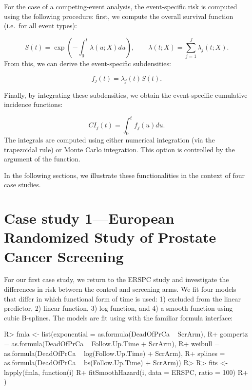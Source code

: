 \documentclass[
]{jss}
\begin{document}
For the case of a competing-event analysis, the event-specific risk is
computed using the following procedure: first, we compute the overall
survival function (i.e.~for all event types):

\[ S(t) = \exp\left(-\int_0^t \lambda(u;X) du\right),\qquad \lambda(t;X) = \sum_{j=1}^J \lambda_j(t;X).\]
From this, we can derive the event-specific subdensities:

\[ f_j(t) = \lambda_j(t)S(t).\]

Finally, by integrating these subdensities, we obtain the event-specific
cumulative incidence functions:

\[ CI_j(t) = \int_0^t f_j(u)du.\] The integrals are computed using
either numerical integration (via the trapezoidal rule) or Monte Carlo
integration. This option is controlled by the argument  of
the  function.

In the following sections, we illustrate these functionalities in the
context of four case studies.

\hypertarget{case-study-1european-randomized-study-of-prostate-cancer-screening}{%
\section{Case study 1---European Randomized Study of Prostate Cancer
Screening}\label{case-study-1european-randomized-study-of-prostate-cancer-screening}}

For our first case study, we return to the ERSPC study and investigate
the differences in risk between the control and screening arms. We fit
four models that differ in which functional form of time is used: 1)
excluded from the linear predictor, 2) linear function, 3) log function,
and 4) a smooth function using cubic B-splines. The models are fit using
 with the familiar formula interface:

\begin{CodeChunk}

\begin{CodeInput}
R> fmla <- list(exponential = as.formula(DeadOfPrCa ~ ScrArm),
R+              gompertz = as.formula(DeadOfPrCa ~ Follow.Up.Time + ScrArm),
R+              weibull = as.formula(DeadOfPrCa ~ log(Follow.Up.Time) + ScrArm),
R+              splines = as.formula(DeadOfPrCa ~ bs(Follow.Up.Time) + ScrArm))
R> 
R> fits <- lapply(fmla, function(i) {
R+   fitSmoothHazard(i, data = ERSPC, ratio = 100)
R+ })
\end{CodeInput}
\end{CodeChunk}
\end{document}
